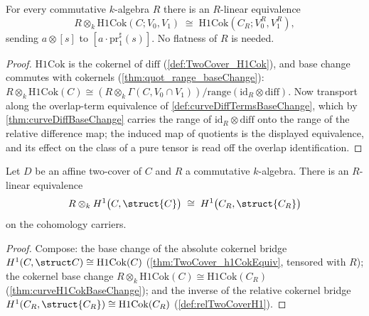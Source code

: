 \begin{theorem}
  \label{thm:curveH1CokBaseChange}
  \leanok
  For every commutative \(k\)-algebra \(R\) there is an \(R\)-linear equivalence
  \[
    R \otimes_k \mathrm{H1Cok}(C; V_0, V_1) \;\cong\;
      \mathrm{H1Cok}(C_R; V_0^R, V_1^R),
  \]
  sending \(a \otimes [s]\) to \([a \cdot \mathrm{pr}_1^\sharp(s)]\). No flatness of
  \(R\) is needed.
\end{theorem}
\begin{proof}
  \leanok
  \(\mathrm{H1Cok}\) is the cokernel of \(\mathrm{diff}\) (\ref{def:TwoCover_H1Cok}),
  and base change commutes with cokernels (\ref{thm:quot_range_baseChange}):
  \(R \otimes_k \mathrm{H1Cok}(C) \cong (R \otimes_k \Gamma(C, V_0 \cap V_1)) /
  \mathrm{range}(\mathrm{id}_R \otimes \mathrm{diff})\). Now transport along the
  overlap-term equivalence of \ref{def:curveDiffTermsBaseChange}, which by
  \ref{thm:curveDiffBaseChange} carries the range of
  \(\mathrm{id}_R \otimes \mathrm{diff}\) onto the range of the relative difference
  map; the induced map of quotients is the displayed equivalence, and its effect on the
  class of a pure tensor is read off the overlap identification.
\end{proof}

\begin{theorem}
  \label{thm:curveH1BaseChange}
  \leanok
  Let \(D\) be an affine two-cover of \(C\) and \(R\) a commutative \(k\)-algebra.
  There is an \(R\)-linear equivalence
  \[
    R \otimes_k H^1\bigl(C, \struct{C}\bigr) \;\cong\;
      H^1\bigl(C_R, \struct{C_R}\bigr)
  \]
  on the cohomology carriers.
\end{theorem}
\begin{proof}
  \leanok
  Compose: the base change of the absolute cokernel bridge
  \(H^1(C, \struct C) \cong \mathrm{H1Cok}(C)\) (\ref{thm:TwoCover_h1CokEquiv},
  tensored with \(R\)); the cokernel base change
  \(R \otimes_k \mathrm{H1Cok}(C) \cong \mathrm{H1Cok}(C_R)\)
  (\ref{thm:curveH1CokBaseChange}); and the inverse of the relative cokernel bridge
  \(H^1(C_R, \struct{C_R}) \cong \mathrm{H1Cok}(C_R)\) (\ref{def:relTwoCoverH1}).
\end{proof}

